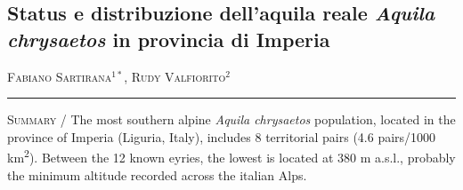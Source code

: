 \setcounter{figure}{0}
\setcounter{table}{0}

\begin{adjustwidth}{-3.5cm}{0cm}
\pagestyle{CIOpage}
\chapter*[\textit{Status} e distribuzione
dell{\textquoteright}aquila reale in provincia di Imperia]{Status e distribuzione dell{\textquoteright}aquila reale \textbf{\textit{Aquila chrysaetos}}\textbf{ }\textbf{\textit{
}}\textbf{in provincia di Imperia}}

\textsc{Fabiano Sartirana}$^{1*}$, \textsc{Rudy Valfiorito}$^2$  \\

 
\noindent\color{MUSEBLUE}\rule{27cm}{2pt}
\vspace{1cm}
\end{adjustwidth}


{\small
\noindent \textsc{\color{MUSEBLUE} Summary} / The most southern alpine 
\textit{Aquila chrysaetos} population, located in the province of Imperia (Liguria, Italy), includes 8 territorial pairs (4.6 pairs/1000 km\textsuperscript{2}). Between the 12 known
eyries, the lowest is located at 380 m a.s.l., probably the minimum
altitude recorded across the italian Alps. \\
}
\vspace{1cm}

